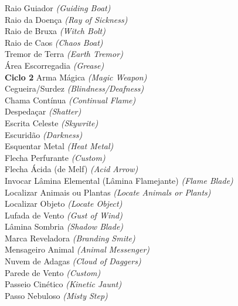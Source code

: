 \documentclass{RPG_Adventure}[2021/10/20]
\begin{document}
{\normalsize Raio Guiador \textit{(Guiding Boat)}\\ }
{\normalsize Raio da Doença \textit{(Ray of Sickness)}\\ }
{\normalsize Raio de Bruxa \textit{(Witch Bolt)}\\ }
{\normalsize Raio de Caos \textit{(Chaos Boat)}\\ }
{\normalsize Tremor de Terra \textit{(Earth Tremor)}\\ }
{\normalsize Área Escorregadia \textit{(Grease)}\\ }
\jump\noindent\textbf{Ciclo 2}
{\normalsize Arma Mágica \textit{(Magic Weapon)}\\ }
{\normalsize Cegueira/Surdez \textit{(Blindness/Deafness)}\\ }
{\normalsize Chama Contínua \textit{(Continual Flame)}\\ }
{\normalsize Despedaçar \textit{(Shatter)}\\ }
{\normalsize Escrita Celeste \textit{(Skywrite)}\\ }
{\normalsize Escuridão \textit{(Darkness)}\\ }
{\normalsize Esquentar Metal \textit{(Heat Metal)}\\ }
{\normalsize Flecha Perfurante \textit{(Custom)}\\ }
{\normalsize Flecha Ácida (de Melf) \textit{(Acid Arrow)}\\ }
{\normalsize Invocar Lâmina Elemental (Lâmina Flamejante) \textit{(Flame Blade)}\\ }
{\normalsize Localizar Animais ou Plantas \textit{(Locate Animals or Plants)}\\ }
{\normalsize Localizar Objeto \textit{(Locate Object)}\\ }
{\normalsize Lufada de Vento \textit{(Gust of Wind)}\\ }
{\normalsize Lâmina Sombria \textit{(Shadow Blade)}\\ }
{\normalsize Marca Reveladora \textit{(Branding Smite)}\\ }
{\normalsize Mensageiro Animal \textit{(Animal Messenger)}\\ }
{\normalsize Nuvem de Adagas \textit{(Cloud of Daggers)}\\ }
{\normalsize Parede de Vento \textit{(Custom)}\\ }
{\normalsize Passeio Cinético \textit{(Kinetic Jaunt)}\\ }
{\normalsize Passo Nebuloso \textit{(Misty Step)}\\ }
\end{document}
